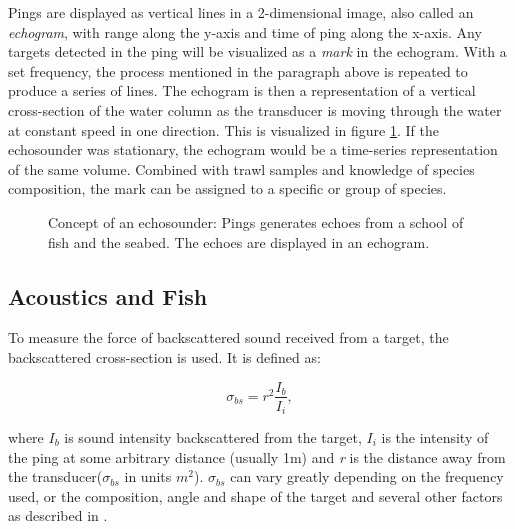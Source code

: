     Pings are displayed as vertical lines in a 2-dimensional image, also called an \textit{echogram}, with range along the y-axis and time of ping along the x-axis. Any targets detected in the ping will be visualized as a \textit{mark} in the echogram. With a set frequency, the process mentioned in the paragraph above is repeated to produce a series of lines. The echogram is then a representation of a vertical cross-section of the water column as the transducer is moving through the water at constant speed in one direction. This is visualized in figure \ref{echogram}. If the echosounder was stationary, the echogram would be a time-series representation of the same volume. Combined with trawl samples and knowledge of species composition, the mark can be assigned to a specific or group of species\cite{simmonds2008fisheries}.
    
    \begin{figure}[H]
        \centering
            
        \caption[Echosounder]{Concept of an echosounder: Pings generates echoes from a school of fish and the seabed. The echoes are displayed in an echogram.}
      	\medskip 
        \label{echogram}
    \end{figure}

    
\subsection{Acoustics and Fish}
    To measure the force of backscattered sound received from a target, the backscattered cross-section is used. It is defined as:
    
    \begin{equation}
        \sigma_{bs} = r^{2}\frac{I_{b}}{I_{i}},
    \end{equation}

    where $I_{b}$ is sound intensity backscattered from the target, $I_{i}$ is the intensity of the ping at some arbitrary distance (usually 1m) and \textit{r} is the distance away from the transducer($\sigma_{bs}$ in units $m^{2}$). $\sigma_{bs}$ can vary greatly depending on the frequency used, or the composition, angle and shape of the target and several other factors as described in \citet{simmonds2008fisheries}. 


